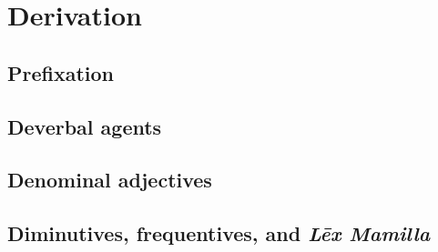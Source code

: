 \chapter{Derivation}

\section{Prefixation}

\section{Deverbal agents}

\section{Denominal adjectives}

\section{Diminutives, frequentives, and \emph{Lēx Mamilla}}
